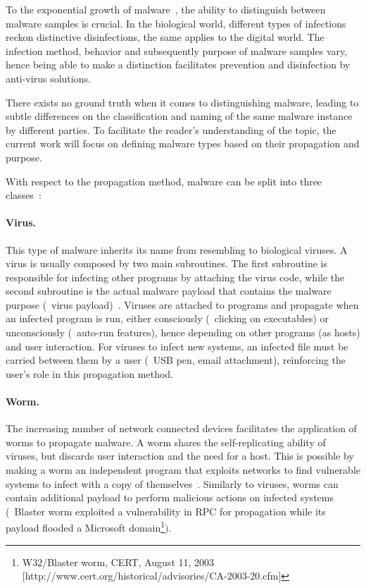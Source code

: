To the exponential growth of malware~\cite{av-test:report}, the ability to distinguish between malware samples is crucial.
In the biological world, different types of infections reckon distinctive disinfections, the same applies to the digital world.
The infection method, behavior and subsequently purpose of malware samples vary, hence being able to make a distinction facilitates prevention and disinfection by anti-virus solutions.

There exists no ground truth when it comes to distinguishing malware, leading to subtle differences on the classification and naming of the same malware instance by different parties.
To facilitate the reader's understanding of the topic, the current work will focus on defining malware types based on their propagation and purpose.

With respect to the propagation method, malware can be split into three classes~\cite{kolter:learning}:

\paragraph{Virus.}%
This type of malware inherits its name from resembling to biological viruses.
A virus is usually composed by two main subroutines.
The first subroutine is responsible for infecting other programs by attaching the virus code, while the second subroutine is the actual malware payload that contains the malware purpose (\ie\ virus payload)~\cite{chen:evolution}.
Viruses are attached to programs and propagate when an infected program is run, either consciously (\eg\ clicking on executables) or unconsciously (\eg\ auto-run features), hence depending on other programs (as hosts) and user interaction.
For viruses to infect new systems, an infected file must be carried between them by a user (\eg\ USB pen, email attachment), reinforcing the user's role in this propagation method.

\paragraph{Worm.} The increasing number of network connected devices facilitates the application of worms to propagate malware.
A worm shares the self-replicating ability of viruses, but discards user interaction and the need for a host.
This is possible by making a worm an independent program that exploits networks to find vulnerable systems to infect with a copy of themselves~\cite{chen:evolution}.
Similarly to viruses, worms can contain additional payload to perform malicious actions on infected systems (\eg\ Blaster worm exploited a vulnerability in RPC for propagation while its payload flooded a Microsoft domain\footnote{W32/Blaster worm, CERT, August 11, 2003 [http://www.cert.org/historical/advisories/CA-2003-20.cfm]}).

